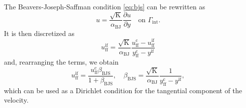 The Beavers-Joseph-Saffman condition \eqref{eq:bjs} can be rewritten as
\begin{equation}
	u = \frac{\sqrt{\mathrm{K}}}{\alpha_\text{BJ}} \frac{\partial u}{\partial 
	y} \quad \text{on $\Gamma_\text{int}$}.
\end{equation}
It is then discretized as
\begin{equation} \label{eq:bjsdisc}
	u_\text{ff}^\text{if} = \frac{\sqrt{\mathrm{K}}}{\alpha_\text{BJ}} 
	\frac{u_\text{ff}^\text{c} - 
	u^\text{if}_\text{ff}}{y_\text{ff}^\text{c}-y^\text{if}}
\end{equation}
and, rearranging the terms, we obtain
\begin{equation}
	u_\text{ff}^\text{if} = 	
	\frac{u^\text{c}_\text{ff} \beta_\text{BJS}}{1+\beta_\text{BJS}}, \quad 
	\beta_\text{BJS} = \frac{\sqrt{\mathrm{K}}}{\alpha_\text{BJ}} 
	\frac{1}{y_\text{ff}^\text{c}-y^\text{if}},
\end{equation}
which can be used as a Dirichlet condition for the tangential component of the 
velocity.
%
